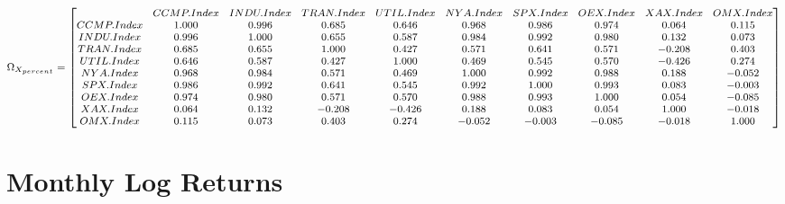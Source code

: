 \documentclass{article}
\begin{document}
\begin{equation*}
\begin{medsize}
\Omega_{X_{percent}}=%
\begin{bmatrix}{}
& CCMP.Index & INDU.Index & TRAN.Index & UTIL.Index & NYA.Index & SPX.Index & OEX.Index & XAX.Index & OMX.Index \\ 
  CCMP.Index & 1.000 & 0.996 & 0.685 & 0.646 & 0.968 & 0.986 & 0.974 & 0.064 & 0.115 \\ 
  INDU.Index & 0.996 & 1.000 & 0.655 & 0.587 & 0.984 & 0.992 & 0.980 & 0.132 & 0.073 \\ 
  TRAN.Index & 0.685 & 0.655 & 1.000 & 0.427 & 0.571 & 0.641 & 0.571 & -0.208 & 0.403 \\ 
  UTIL.Index & 0.646 & 0.587 & 0.427 & 1.000 & 0.469 & 0.545 & 0.570 & -0.426 & 0.274 \\ 
  NYA.Index & 0.968 & 0.984 & 0.571 & 0.469 & 1.000 & 0.992 & 0.988 & 0.188 & -0.052 \\ 
  SPX.Index & 0.986 & 0.992 & 0.641 & 0.545 & 0.992 & 1.000 & 0.993 & 0.083 & -0.003 \\ 
  OEX.Index & 0.974 & 0.980 & 0.571 & 0.570 & 0.988 & 0.993 & 1.000 & 0.054 & -0.085 \\ 
  XAX.Index & 0.064 & 0.132 & -0.208 & -0.426 & 0.188 & 0.083 & 0.054 & 1.000 & -0.018 \\ 
  OMX.Index & 0.115 & 0.073 & 0.403 & 0.274 & -0.052 & -0.003 & -0.085 & -0.018 & 1.000 \\ 
  \end{bmatrix}
\end{medsize}
\end{equation*}
\section*{Monthly Log Returns}
\end{document}
